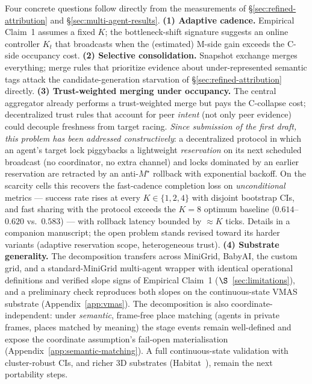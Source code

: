 \documentclass{article}
\begin{document}
Four concrete questions follow directly from the measurements of \S\ref{sec:refined-attribution} and \S\ref{sec:multi-agent-results}.
\textbf{(1) Adaptive cadence.} Empirical Claim~1 assumes a fixed $K$; the bottleneck-shift signature suggests an online controller $K_t$ that broadcasts when the (estimated) M-side gain exceeds the C-side occupancy cost.
\textbf{(2) Selective consolidation.} Snapshot exchange merges everything; merge rules that prioritize evidence about under-represented semantic tags attack the candidate-generation starvation of \S\ref{sec:refined-attribution} directly.
\textbf{(3) Trust-weighted merging under occupancy.} The central aggregator already performs a trust-weighted merge but pays the C-collapse cost; decentralized trust rules that account for peer \emph{intent} (not only peer evidence) could decouple freshness from target racing. \emph{Since submission of the first draft, this problem has been addressed constructively}: a decentralized protocol in which an agent's target lock piggybacks a lightweight \emph{reservation} on its next scheduled broadcast (no coordinator, no extra channel) and locks dominated by an earlier reservation are retracted by an anti-$M^\star$ rollback with exponential backoff. On the scarcity cells this recovers the fast-cadence completion loss on \emph{unconditional} metrics --- success rate rises at every $K\in\{1,2,4\}$ with disjoint bootstrap CIs, and fast sharing with the protocol exceeds the $K{=}8$ optimum baseline ($0.614$--$0.620$ vs.\ $0.583$) --- with rollback latency bounded by ${\approx}K$ ticks. Details in a companion manuscript; the open problem stands revised toward its harder variants (adaptive reservation scope, heterogeneous trust).
\textbf{(4) Substrate generality.} The decomposition transfers across MiniGrid, BabyAI, the custom grid, and a standard-MiniGrid multi-agent wrapper with identical operational definitions and verified slope signs of Empirical Claim~1 ($\S$~\ref{sec:limitations}), and a preliminary check reproduces both slopes on the continuous-state VMAS substrate (Appendix~\ref{app:vmas}). The decomposition is also coordinate-independent: under \emph{semantic}, frame-free place matching (agents in private frames, places matched by meaning) the stage events remain well-defined and expose the coordinate assumption's fail-open materialisation (Appendix~\ref{app:semantic-matching}). A full continuous-state validation with cluster-robust CIs, and richer 3D substrates (Habitat~\citep{savva2019habitat}), remain the next portability steps.
\end{document}
